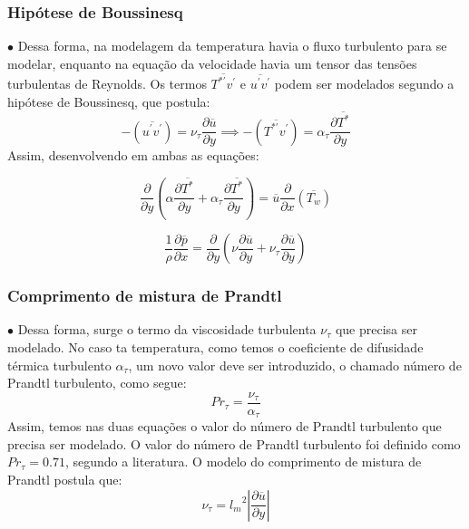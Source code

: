 \documentclass[xcolor=dvipsnames,10pt,aspectratio=169]{beamer}
\begin{document}
		
		\begin{frame}
			\frametitle{Hipótese de Boussinesq}
			$\bullet$ Dessa forma, na modelagem da temperatura havia o fluxo turbulento para se modelar, enquanto na equação da velocidade havia um tensor das tensões turbulentas de Reynolds. Os termos $\overline{T^{\ast\prime}  v^\prime}$ e $ \overline{u^\prime  v^\prime} $ podem ser modelados segundo a hipótese de Boussinesq, que postula:
			\begin{equation}\label{bou}
			-\left(\overline{ u^\prime  v^\prime}\right) = 
			\nu_\tau \frac{\partial{\overline{u}}}{\partial{y}}
			\implies
			-\left(\overline{ T^{\ast\prime}  v^\prime}\right) = 
			\alpha_\tau \frac{\partial{\overline{T^\ast}}}{\partial{y}}
			\end{equation}
			Assim, desenvolvendo em ambas as equações: 
			\\
			\begin{minipage}[h!]{0.45\textwidth}
				\begin{equation}\label{equation_var}
				{\frac{\partial{}}{\partial{y}}} \left(\alpha {\frac{\partial{\overline{T^\ast}}}{\partial{y}}}   
				+ \alpha_\tau  \frac{\partial \overline{T^\ast}}{\partial y} \right)
				= 
				\overline{u}\frac{\partial{}}{\partial{x}}\left(\overline{T_w}\right)  
				\end{equation}
			\end{minipage}\hfill
			\begin{minipage}[h!]{0.45\textwidth}
				\begin{equation}
				\frac{1}{\rho} \frac{\partial \overline{p}}{\partial x} = \frac{\partial}{\partial y} \left( \nu  \frac{\partial \overline{u}}{\partial y} + \nu_\tau  \frac{\partial \overline{u}}{\partial y}\right)  
				\end{equation}
			\end{minipage}
		\end{frame}
	
	
	
	
		
		\begin{frame}
			\frametitle{Comprimento de mistura de Prandtl}
			$\bullet$ Dessa forma, surge o termo da viscosidade turbulenta $\nu_\tau$ que precisa ser modelado. No caso ta temperatura, como temos o coeficiente de difusidade térmica turbulento $\alpha_\tau$, um novo valor deve ser introduzido, o chamado número de Prandtl turbulento, como segue:
			\begin{equation}
				Pr_\tau = \frac{\nu_\tau}{\alpha_\tau}
			\end{equation} 
			Assim, temos nas duas equações o valor do número de Prandtl turbulento que precisa ser modelado. O valor do número de Prandtl turbulento foi definido como $ Pr_\tau = 0.71$, segundo a literatura.
			O modelo do comprimento de mistura de Prandtl postula que:
			\begin{equation}
			\nu_\tau = {l_m}^2 \left| \frac{\partial \overline{u}}{\partial y} \right|
			\end{equation}
		\end{frame}
	
\end{document}
